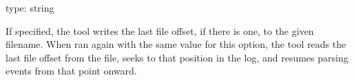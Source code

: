 \documentclass[letterpaper,10pt,english]{sphinxmanual}
\begin{document}
\begin{fulllineitems}
\label{\detokenize{mariadb-query-digest:cmdoption-mariadb-query-digest-resume}}
type: string

If specified, the tool writes the last file offset, if there is one,
to the given filename. When ran again with the same value for this option,
the tool reads the last file offset from the file, seeks to that position
in the log, and resumes parsing events from that point onward.

\end{fulllineitems}

\end{document}
